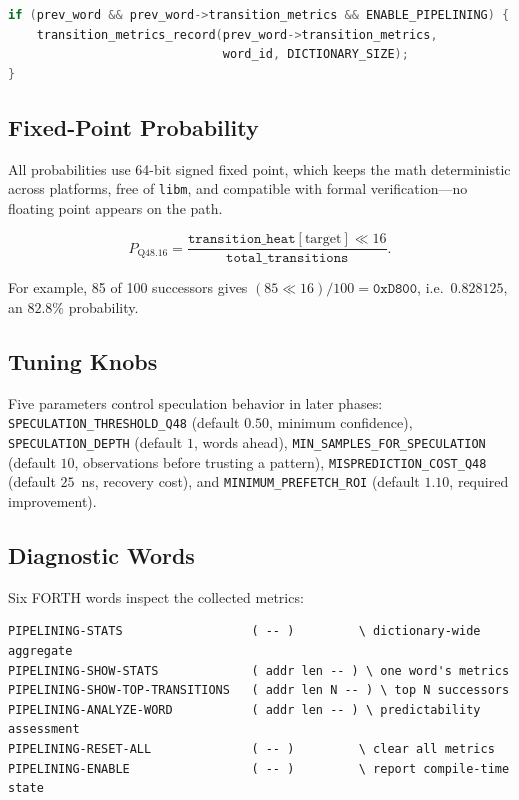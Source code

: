 \begin{lstlisting}[language=C]
if (prev_word && prev_word->transition_metrics && ENABLE_PIPELINING) {
    transition_metrics_record(prev_word->transition_metrics,
                              word_id, DICTIONARY_SIZE);
}
\end{lstlisting}

\subsection{Fixed-Point Probability}

All probabilities use 64-bit signed \Qtype{} fixed point, which keeps the math
deterministic across platforms, free of \texttt{libm}, and compatible with
formal verification---no floating point appears on the path.

\begin{equation}
  P_{\text{Q48.16}}
  = \frac{\mathtt{transition\_heat}[\text{target}] \ll 16}
         {\mathtt{total\_transitions}}.
\end{equation}

For example, 85 of 100 successors gives $(85 \ll 16)/100 = \mathtt{0xD800}$,
i.e.\ $0.828125$, an $82.8\%$ probability.

\subsection{Tuning Knobs}

Five parameters control speculation behavior in later phases:
\lstinline{SPECULATION_THRESHOLD_Q48} (default $0.50$, minimum confidence),
\lstinline{SPECULATION_DEPTH} (default $1$, words ahead),
\lstinline{MIN_SAMPLES_FOR_SPECULATION} (default $10$, observations before
trusting a pattern), \lstinline{MISPREDICTION_COST_Q48} (default $25$~ns,
recovery cost), and \lstinline{MINIMUM_PREFETCH_ROI} (default $1.10$, required
improvement).

\subsection{Diagnostic Words}

Six FORTH words inspect the collected metrics:

\begin{lstlisting}[language=Forth]
PIPELINING-STATS                  ( -- )         \ dictionary-wide aggregate
PIPELINING-SHOW-STATS             ( addr len -- ) \ one word's metrics
PIPELINING-SHOW-TOP-TRANSITIONS   ( addr len N -- ) \ top N successors
PIPELINING-ANALYZE-WORD           ( addr len -- ) \ predictability assessment
PIPELINING-RESET-ALL              ( -- )         \ clear all metrics
PIPELINING-ENABLE                 ( -- )         \ report compile-time state
\end{lstlisting}

